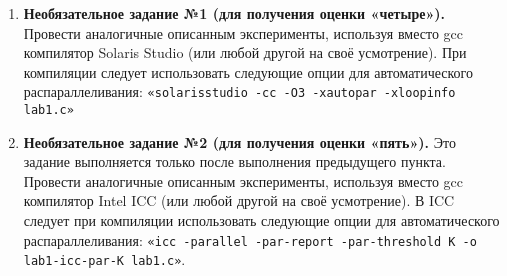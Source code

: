 {\begin{enumerate}
\begin{itemize}
				 lab1-par-K для значений \\$N\;=\;{N1,\;N1+\Delta,\;N1+2\Delta,\;N1+3\Delta,…,\;N2}$ и записывать получающиеся значения времени delta\textunderscore ms(N) в функцию $par-K(N)$;
				 $\Delta$ выбрать так: $\Delta\;=\;(N2\;-\;N1)/10$.
			\end{itemize}
		 отчёт о проделанной работе.
		 к устным вопросам на защите.
		\item\textbf{Необязательное задание №1 (для получения оценки «четыре»).} Провести аналогичные описанным эксперименты, используя вместо gcc компилятор Solaris Studio (или любой другой на своё усмотрение). При компиляции следует использовать следующие опции для автоматического распараллеливания: \verb+«solarisstudio -cc -O3 -xautopar -xloopinfo lab1.c»+
 		\item\textbf{Необязательное задание №2 (для получения оценки «пять»).} Это задание выполняется только после выполнения предыдущего пункта. Провести аналогичные описанным эксперименты, используя вместо gcc компилятор Intel ICC (или любой другой на своё усмотрение). В ICC следует при компиляции использовать следующие опции для автоматического распараллеливания: \verb+«icc -parallel -par-report -par-threshold K -o lab1-icc-par-K lab1.c»+.
	\end{enumerate}
	
}